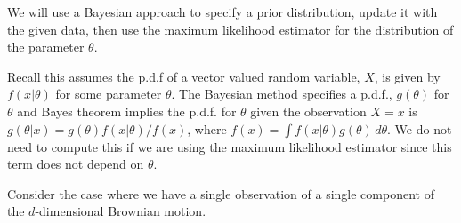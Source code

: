 \documentclass[11pt,fleqn]{article}
\begin{document}
We will use a Bayesian approach to specify a prior distribution, update
it with the given data, then use the maximum likelihood estimator
for the distribution of the parameter $\theta$.

Recall this assumes the p.d.f of a vector valued random variable, $X$, is
given by $f(x|\theta)$ for some parameter $\theta$. The Bayesian method
specifies a p.d.f., $g(\theta)$ for $\theta$ and Bayes theorem implies
the p.d.f. for $\theta$ given the observation $X = x$ is $g(\theta| x)
= g(\theta) f(x|\theta)/f(x)$, where $f(x) = \int f(x| \theta)
g(\theta)\,d\theta$. We do not need to compute this if we are using the
maximum likelihood estimator since this term does not depend on $\theta$.

Consider the case where we have a single observation of a single
component of the $d$-dimensional Brownian motion.
\end{document}
